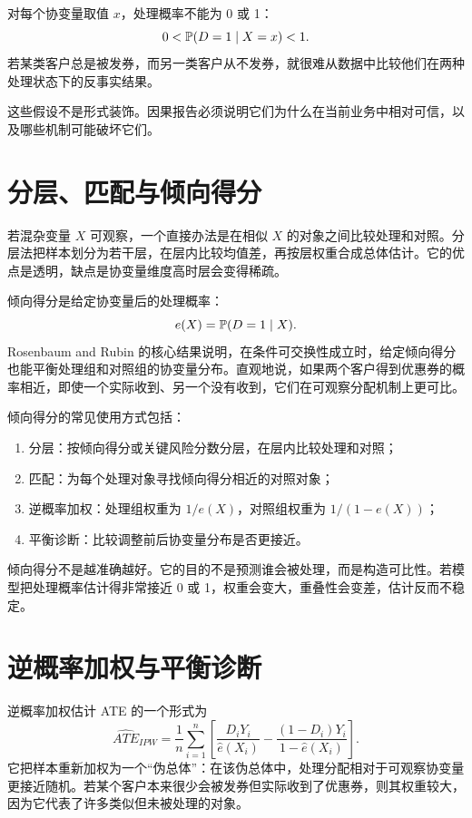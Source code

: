\documentclass[UTF8,fontset=fandol,openany,zihao=-4]{ctexbook}
\begin{document}
\begin{definition}[重叠性]
对每个协变量取值 \(x\)，处理概率不能为 0 或 1：
\[
  0<\mathbb P(D=1\mid X=x)<1.
\]
若某类客户总是被发券，而另一类客户从不发券，就很难从数据中比较他们在两种处理状态下的反事实结果。
\end{definition}

这些假设不是形式装饰。因果报告必须说明它们为什么在当前业务中相对可信，以及哪些机制可能破坏它们。

\section{分层、匹配与倾向得分}

若混杂变量 \(X\) 可观察，一个直接办法是在相似 \(X\) 的对象之间比较处理和对照。分层法把样本划分为若干层，在层内比较均值差，再按层权重合成总体估计。它的优点是透明，缺点是协变量维度高时层会变得稀疏。

倾向得分是给定协变量后的处理概率：
\[
  e(X)=\mathbb P(D=1\mid X).
\]
Rosenbaum and Rubin 的核心结果说明，在条件可交换性成立时，给定倾向得分也能平衡处理组和对照组的协变量分布。直观地说，如果两个客户得到优惠券的概率相近，即使一个实际收到、另一个没有收到，它们在可观察分配机制上更可比。

倾向得分的常见使用方式包括：
\begin{enumerate}
  \item 分层：按倾向得分或关键风险分数分层，在层内比较处理和对照；
  \item 匹配：为每个处理对象寻找倾向得分相近的对照对象；
  \item 逆概率加权：处理组权重为 \(1/e(X)\)，对照组权重为 \(1/(1-e(X))\)；
  \item 平衡诊断：比较调整前后协变量分布是否更接近。
\end{enumerate}

倾向得分不是越准确越好。它的目的不是预测谁会被处理，而是构造可比性。若模型把处理概率估计得非常接近 0 或 1，权重会变大，重叠性会变差，估计反而不稳定。

\section{逆概率加权与平衡诊断}

逆概率加权估计 ATE 的一个形式为
\[
  \widehat{ATE}_{IPW}
  =
  \frac{1}{n}\sum_{i=1}^{n}
  \left[
    \frac{D_iY_i}{\hat e(X_i)}
    -
    \frac{(1-D_i)Y_i}{1-\hat e(X_i)}
  \right].
\]
它把样本重新加权为一个“伪总体”：在该伪总体中，处理分配相对于可观察协变量更接近随机。若某个客户本来很少会被发券但实际收到了优惠券，则其权重较大，因为它代表了许多类似但未被处理的对象。
\end{document}
